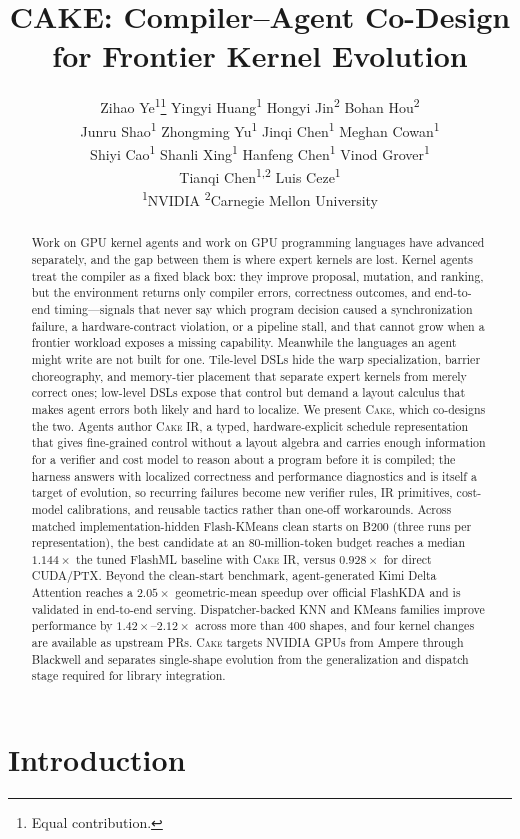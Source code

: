 \documentclass[11pt]{article}
\title{\textbf{CAKE}: \textbf{C}ompiler--\textbf{A}gent Co-Design\\
for Frontier \textbf{K}ernel \textbf{E}volution}
\author{%
Zihao Ye\textsuperscript{1}\thanks{Equal contribution.}\quad
Yingyi Huang\textsuperscript{1}\footnotemark[1]\quad
Hongyi Jin\textsuperscript{2}\quad
Bohan Hou\textsuperscript{2}\\
Junru Shao\textsuperscript{1}\quad
Zhongming Yu\textsuperscript{1}\quad
Jinqi Chen\textsuperscript{1}\quad
Meghan Cowan\textsuperscript{1}\\
Shiyi Cao\textsuperscript{1}\quad
Shanli Xing\textsuperscript{1}\quad
Hanfeng Chen\textsuperscript{1}\quad
Vinod Grover\textsuperscript{1}\\
Tianqi Chen\textsuperscript{1,2}\quad
Luis Ceze\textsuperscript{1}\\[0.6ex]
\small
\textsuperscript{1}NVIDIA\qquad
\textsuperscript{2}Carnegie Mellon University%
}
\date{}
\newcommand{\cake}{\textsc{Cake}}
\newcommand{\cakeir}{\textsc{Cake IR}}
\begin{document}
\maketitle

\begin{abstract}
Work on GPU kernel agents and work on GPU programming languages have advanced
separately, and the gap between them is where expert kernels are lost. Kernel
agents treat the compiler as a fixed black box: they improve proposal, mutation,
and ranking, but the environment returns only compiler errors, correctness
outcomes, and end-to-end timing---signals that never say which program decision
caused a synchronization failure, a hardware-contract violation, or a pipeline
stall, and that cannot grow when a frontier workload exposes a missing
capability. Meanwhile the languages an agent might write are not built for one.
Tile-level DSLs hide the warp specialization, barrier choreography, and
memory-tier placement that separate expert kernels from merely correct ones;
low-level DSLs expose that control but demand a layout calculus that makes agent
errors both likely and hard to localize. We present \cake{}, which co-designs
the two. Agents author \cakeir{}, a typed, hardware-explicit schedule
representation that gives fine-grained control without a layout algebra and
carries enough information for a verifier and cost model to reason about a
program before it is compiled; the harness answers with localized correctness
and performance diagnostics and is itself a target of evolution, so
recurring failures become new verifier rules, IR primitives, cost-model
calibrations, and reusable tactics rather than one-off workarounds. Across
matched implementation-hidden Flash-KMeans clean starts on B200 (three runs per
representation), the best candidate at an 80-million-token budget reaches a
median $1.144\times$ the tuned FlashML baseline with \cakeir{}, versus
$0.928\times$ for direct CUDA/PTX.
Beyond the clean-start benchmark, agent-generated Kimi Delta Attention reaches
a $2.05\times$ geometric-mean speedup over official FlashKDA and is validated
in end-to-end serving. Dispatcher-backed KNN and KMeans families improve
performance by $1.42\times$--$2.12\times$ across more than 400 shapes, and four
kernel changes are available as upstream PRs. \cake{} targets NVIDIA GPUs from
Ampere through Blackwell and separates single-shape evolution from the
generalization and dispatch stage required for library integration.
\end{abstract}

\section{Introduction}
\label{sec:intro}
\end{document}
